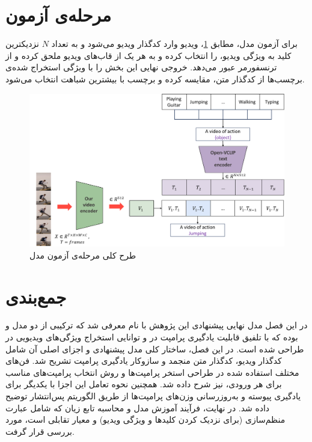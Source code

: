 \section{مرحله‌ی آزمون }
برای آزمون مدل، مطابق \cref{fig.35}، ویدیو وارد کدگذار ویدیو می‌شود و به تعداد $N$ نزدیکترین کلید به ویژگی ویدیو، را انتخاب کرده و به هر یک از قاب‌های ویدیو ملحق کرده و از ترنسفورمر عبور می‌دهد. خروجی نهایی این بخش را با ویژگی استخراج شده‌ی برچسب‌ها از کدگذار متن، مقایسه کرده و برچسب با بیشترین شباهت انتخاب می‌شود.
‌\begin{figure}
	\centering\includegraphics[scale=.48]{Images/Chapter3/test_phase.png}
	\caption[]{طرح کلی مرحله‌ی آزمون مدل }
	\label{fig.35}
\end{figure}
\section{جمع‌بندی}
در این فصل مدل نهایی پیشنهادی این پژوهش با نام  معرفی شد که ترکیبی از دو مدل  و  بوده که با تلفیق قابلیت یادگیری پرامپت در  و توانایی استخراج ویژگی‌های ویدیویی در  طراحی شده است. در این فصل، ساختار کلی مدل پیشنهادی و اجزای اصلی آن شامل کدگذار ویدیو، کدگذار متن منجمد و سازوکار یادگیری پرامپت تشریح شد. فن‌های مختلف استفاده شده در طراحی استخر پرامپت‌ها و روش انتخاب پرامپت‌های مناسب برای هر ورودی، نیز شرح داده شد. همچنین نحوه تعامل این اجزا با یکدیگر برای یادگیری پیوسته و به‌روزرسانی وزن‌های پرامپت‌ها از طریق الگوریتم پس‌انتشار توضیح داده شد. در نهایت، فرآیند آموزش مدل و محاسبه تابع زیان که شامل عبارت منظم‌سازی (برای نزدیک کردن کلیدها و ویژگی ویدیو) و معیار تقابلی است، مورد بررسی قرار گرفت.


